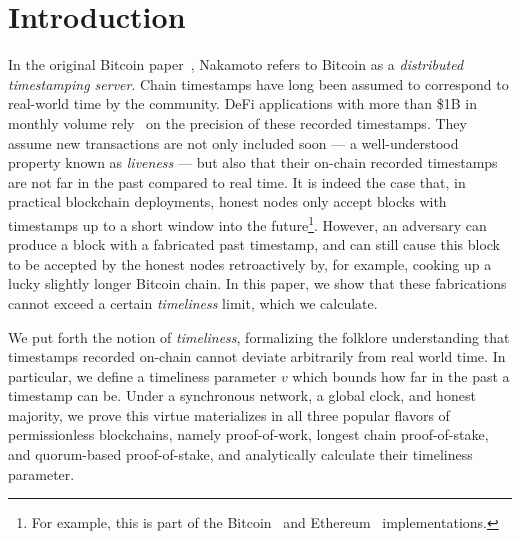 \section{Introduction}
In the original Bitcoin paper~\cite{bitcoin}, Nakamoto refers to
Bitcoin as a \emph{distributed timestamping server}.
Chain timestamps have long been assumed to correspond to real-world time by the community.
DeFi applications with more than \$1B in monthly volume
rely~\cite{0x-timestamp} on the precision of these recorded timestamps.
They assume new transactions are not only
included soon --- a well-understood property known as \emph{liveness} ---
but also that their on-chain recorded timestamps are not far in the past compared to real time.
It is indeed the case that, in practical blockchain deployments, honest nodes only accept
blocks with timestamps up to a short window into the future\footnote{
  For example, this is part of the Bitcoin~\cite{bitcoin-code-future-blocks}
  and Ethereum~\cite{geth-future-blocks} implementations.
}.
However, an adversary can produce a block with a fabricated past timestamp,
and can still cause this block to be accepted by the honest nodes retroactively by, for example, cooking
up a lucky slightly longer Bitcoin chain. In this paper, we show that these fabrications
cannot exceed a certain \emph{timeliness} limit, which we calculate.


We put forth the notion of \emph{timeliness}, formalizing the folklore
understanding that timestamps recorded on-chain cannot deviate arbitrarily
from real world time. In particular, we define a timeliness parameter $v$ which bounds
how far in the past a timestamp can be. Under a synchronous network, a global clock, and honest majority, we prove this virtue materializes in all three popular flavors of
permissionless blockchains, namely proof-of-work,
longest chain proof-of-stake, and quorum-based proof-of-stake, and analytically
calculate their timeliness parameter.

